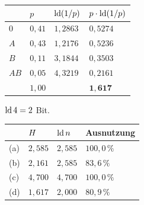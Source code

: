 \begin{aufgabe}
\begin{center}
\renewcommand{\arraystretch}{1.46}
\begin{tabular}{@{}P{1.6cm}P{1.6cm}P{2.0cm}P{2.0cm}@{}}
\toprule
& $p$ & $\operatorname{ld}(1/p)$ & $p\cdot\operatorname{ld}(1/p)$\\
\midrule
$0$ & $0{,}41$ & $1{,}2863$ & $0{,}5274$\\
$A$ & $0{,}43$ & $1{,}2176$ & $0{,}5236$\\
$B$ & $0{,}11$ & $3{,}1844$ & $0{,}3503$\\
$AB$ & $0{,}05$ & $4{,}3219$ & $0{,}2161$\\
\midrule
& $1{,}00$ & & $\mathbf{1{,}617}$\\
\bottomrule
\end{tabular}
\end{center}

 $\operatorname{ld} 4 = 2$ Bit.

\begin{center}
{\small
\renewcommand{\arraystretch}{1.48}
\begin{tabular}{@{}P{1.0cm}P{1.8cm}P{1.8cm}P{2.0cm}@{}}
\toprule
& $H$ & $\operatorname{ld} n$ & \textbf{Ausnutzung}\\
\midrule
(a) & $2{,}585$ & $2{,}585$ & $100{,}0\,\%$\\
(b) & $2{,}161$ & $2{,}585$ & $83{,}6\,\%$\\
(c) & $4{,}700$ & $4{,}700$ & $100{,}0\,\%$\\
(d) & $1{,}617$ & $2{,}000$ & $80{,}9\,\%$\\
\bottomrule
\end{tabular}}
\end{center}

\begin{center}
\begin{minipage}{0.88\textwidth}
\end{minipage}
\end{center}
\end{aufgabe}

